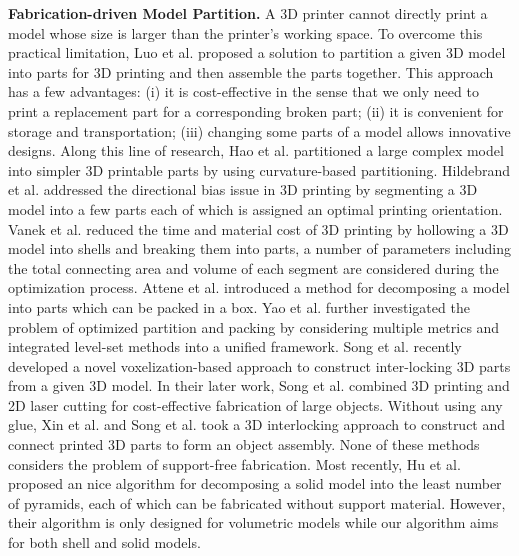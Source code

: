 \textbf{Fabrication-driven Model Partition.} A 3{D} printer cannot directly print a model whose size is larger than the printer's working space. To overcome this practical limitation, Luo et al. \cite{LuoBRM12} proposed a solution to partition a given 3D model into parts for 3D printing and then assemble the parts together. This approach has a few advantages: (i) it is cost-effective in the sense that we only need to print a replacement part for a corresponding broken part; (ii) it is convenient for storage and transportation; (iii) changing some parts of a model allows innovative designs. Along this line of research, Hao et al. \cite{hao2011efficient} partitioned a large complex model into simpler 3D printable parts by using curvature-based partitioning. Hildebrand et al. \cite{HildebrandBA13} addressed the directional bias issue in 3D printing by segmenting a 3D model into a few parts each of which is assigned an optimal printing orientation. Vanek et al. \cite{VanekGBMCSM14} reduced the time and material cost of 3D printing by hollowing a 3D model into shells and breaking them into parts, a number of parameters including the total connecting area and volume of each segment are considered during the optimization process. Attene et al. \cite{attene2015shapes} introduced a method for decomposing a model into parts which can be packed in a box. Yao et al. \cite{yao2015level} further investigated the problem of optimized partition and packing by considering multiple metrics and integrated level-set methods into a unified framework. Song et al. \cite{SongFLF15} recently developed a novel voxelization-based approach to construct inter-locking 3D parts from a given 3D model. In their later work, Song et al. \cite{song2016cofifab} combined 3D printing and 2D laser cutting for cost-effective fabrication of large objects. Without using any glue, Xin et al. \cite{XinLFWHC11} and Song et al. \cite{SongFC12} took a 3D interlocking approach to construct and connect printed 3D parts to form an object assembly. None of these methods considers the problem of support-free fabrication. Most recently, Hu et al. \cite{Hu_siga14} proposed an nice algorithm for decomposing a solid model into the least number of pyramids, each of which can be fabricated without support material. However, their algorithm is only designed for volumetric models while our algorithm aims for both shell and solid models.







